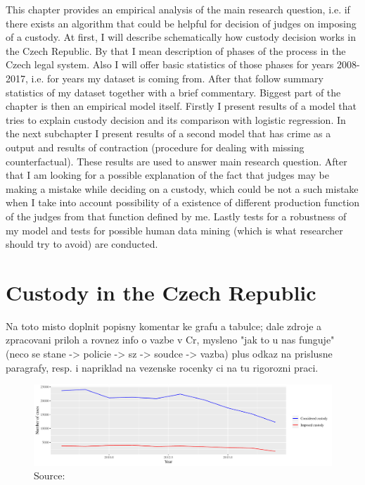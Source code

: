 \documentclass[12pt, twoside]{book} %
\begin{document}
This chapter provides an empirical analysis of the main research question, i.e. if there exists an algorithm that could be helpful for decision of judges on imposing of a custody. At first, I will describe schematically how custody decision works in the Czech Republic. By that I mean description of phases of the process in the Czech legal system. Also I will offer basic statistics of those phases for years 2008-2017, i.e. for years my dataset is coming from. After that follow summary statistics of my dataset together with a brief commentary.\newline
Biggest part of the chapter is then an empirical model itself. Firstly I present results of a model that tries to explain custody decision and its comparison with logistic regression. In the next subchapter I present results of a second model that has crime as a output and results of contraction (procedure for dealing with missing counterfactual). These results are used to answer main research question. After that I am looking for a possible explanation of the fact that judges may be making a mistake while deciding on a custody, which could be not a such mistake when I take into account possibility of a existence of different production function of the judges from that function defined by me. Lastly tests for a robustness of my model and tests for possible human data mining (which is what researcher should try to avoid) are conducted. 


\section{Custody in the Czech Republic}      %

Na toto misto doplnit popisny komentar ke grafu a tabulce; dale zdroje a zpracovani priloh a rovnez info o 
vazbe v Cr, mysleno "jak to u nas funguje" (neco se stane -> policie -> sz -> soudce -> vazba) plus odkaz na prislusne paragrafy, resp. i napriklad na vezenske rocenky ci na tu rigorozni praci. 


\begin{figure}[H]
\includegraphics[width=\textwidth]{plot_21_1.pdf}
{\small Source: }
\end{figure}
\end{document}
